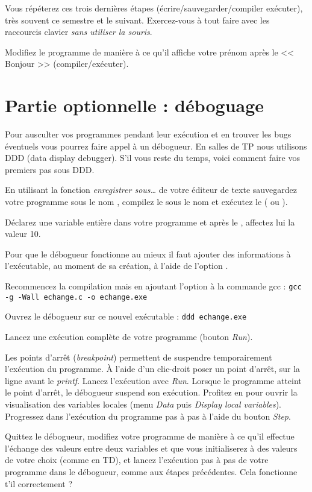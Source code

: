 Vous répéterez ces trois dernières étapes (écrire/sauvegarder/compiler exécuter), très souvent ce semestre et le suivant. Exercez-vous à tout faire avec les raccourcis clavier \emph{sans utiliser la souris}.  


\begin{lastenu} 
\item Modifiez le programme de manière à ce qu'il affiche
  votre prénom après le << Bonjour >> (compiler/exécuter).
\end{lastenu}

\section*{Partie optionnelle : déboguage}

Pour ausculter vos programmes pendant leur exécution et en trouver les bugs éventuels vous pourrez faire appel à un débogueur. En salles de TP nous utilisons DDD (data display debugger). S'il vous reste du temps, voici comment faire vos premiers pas sous DDD.

\begin{lastenu}
  \item En utilisant la fonction \emph{enregistrer sous\ldots} de votre éditeur de texte sauvegardez votre programme sous le nom , compilez le sous le nom  et exécutez le ( ou ).
\item Déclarez une variable entière  dans votre programme et après le , affectez lui la valeur 10.
 \end{lastenu}

Pour que le débogueur fonctionne au mieux il faut ajouter des informations à l'exécutable, au moment de sa création, à l'aide de l'option . 
\begin{lastenu}
\item Recommencez la compilation mais en ajoutant l'option  à la commande gcc :
  \verb|gcc -g -Wall echange.c -o echange.exe|
\item Ouvrez le débogueur sur ce nouvel exécutable :
\verb|ddd echange.exe|
\item Lancez une exécution complète de votre programme (bouton \emph{Run}). 
\item Les points d'arrêt (\emph{breakpoint}) permettent de suspendre temporairement l'exécution du programme. À l'aide d'un clic-droit poser un point d'arrêt, sur la ligne avant le \emph{printf}. Lancez l'exécution avec \emph{Run}. Lorsque le programme atteint le point d'arrêt, le débogueur suspend son exécution. Profitez en pour ouvrir la visualisation des variables locales (menu \emph{Data} puis \emph{Display local variables}). Progressez dans l'exécution du programme pas à pas à l'aide du bouton \emph{Step}. 
\item Quittez le débogueur, modifiez votre programme de manière à ce qu'il effectue l'échange des valeurs entre deux variables  et  que vous initialiserez à des valeurs de votre choix (comme en TD), et lancez l'exécution pas à pas de votre programme dans le débogueur, comme aux étapes précédentes. Cela fonctionne t'il correctement ?
\end{lastenu}
